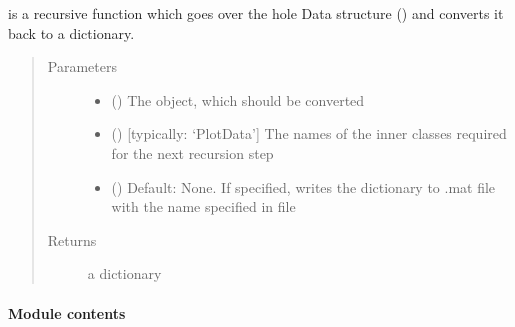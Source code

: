 \documentclass[letterpaper,10pt,english]{sphinxmanual}
\begin{document}
\begin{fulllineitems}
\label{\detokenize{DataAnalyzer.Functions:DataAnalyzer.Functions.func_mat.save}}
 is a recursive function which goes over the hole Data structure ()
and converts it back to a dictionary.
\begin{quote}\begin{description}
\item[{Parameters}] \leavevmode\begin{itemize}
\item {} 
 () \textendash{} The object, which should be converted

\item {} 
 (\sphinxstyleliteralemphasis{\sphinxupquote{{[}}}\sphinxstyleliteralemphasis{\sphinxupquote{, }}\sphinxstyleliteralemphasis{\sphinxupquote{, }}\sphinxstyleliteralemphasis{\sphinxupquote{{]}}}) \textendash{} {[}typically: ‘PlotData’{]} The names of the inner classes required for the next recursion step

\item {} 
 () \textendash{} Default: None. If specified,  writes the dictionary to .mat file with the name specified in file

\end{itemize}

\item[{Returns}] \leavevmode
a dictionary

\end{description}\end{quote}

\end{fulllineitems}



\paragraph{Module contents}
\label{\detokenize{DataAnalyzer.Functions:module-DataAnalyzer.Functions}}\label{\detokenize{DataAnalyzer.Functions:module-contents}}
\end{document}
